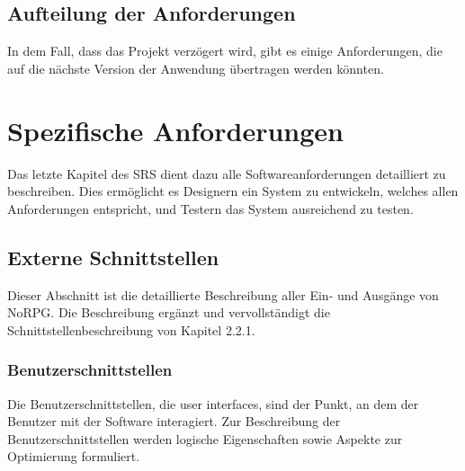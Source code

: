 	\subsection{Aufteilung der Anforderungen}
		In dem Fall, dass das Projekt verzögert wird, gibt es einige Anforderungen, die auf die nächste Version der Anwendung übertragen werden könnten.

\section{Spezifische Anforderungen}
	Das letzte Kapitel des SRS dient dazu alle Softwareanforderungen detailliert zu beschreiben. Dies ermöglicht es Designern ein System zu entwickeln, welches allen Anforderungen entspricht, und Testern das System ausreichend zu testen.
	
	\subsection{Externe Schnittstellen}
		Dieser Abschnitt ist die detaillierte Beschreibung aller Ein- und Ausgänge von NoRPG. Die Beschreibung ergänzt und vervollständigt die Schnittstellenbeschreibung von Kapitel 2.2.1. 
	
		
		\subsubsection{Benutzerschnittstellen}
			Die Benutzerschnittstellen, die user interfaces, sind der Punkt, an dem der Benutzer mit der Software interagiert. Zur Beschreibung der Benutzerschnittstellen werden logische Eigenschaften sowie Aspekte zur Optimierung formuliert.
			
